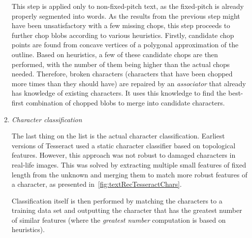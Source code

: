 \begin{enumerate}
    This step is applied only to non-fixed-pitch text, as the fixed-pitch is already properly segmented into words. As the results from the previous step might have been unsatisfactory with a few missing chops, this step proceeds to further chop blobs according to various heuristics. Firstly, candidate chop points are found from concave vertices of a polygonal approximation of the outline. Based on heuristics, a few of these candidate chops are then performed, with the number of them being higher than the actual chops needed. Therefore, broken characters (characters that have been chopped more times than they should have) are repaired by an \emph{associator} that already has knowledge of existing characters. It uses this knowledge to find the best-first combination of chopped blobs to merge into candidate characters.
    
    \item \emph{Character classification}
    
    The last thing on the list is the actual character classification. Earliest versions of Tesseract used a static character classifier based on topological features. However, this approach was not robust to damaged characters in real-life images. This was solved by extracting multiple small features of fixed length from the unknown and merging them to match more robust features of a character, as presented in~\cref{fig:textRecTesseractChars}.
    
    Classification itself is then performed by matching the characters to a training data set and outputting the character that has the greatest number of similar features (where the \emph{greatest number} computation is based on heuristics).
    
\end{enumerate}

